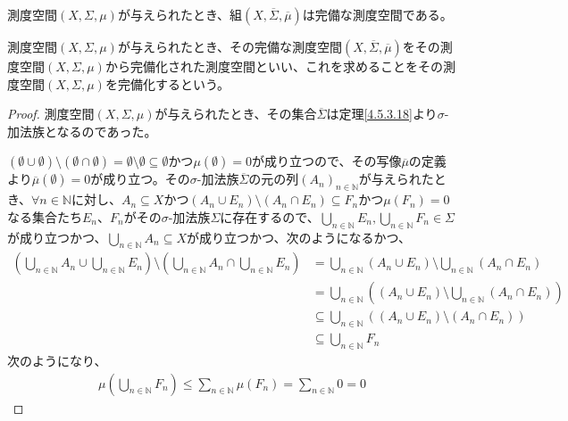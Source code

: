 \documentclass[dvipdfmx]{jsarticle}
\begin{document}
\begin{thm}\label{4.5.3.21}
測度空間$(X,\varSigma,\mu)$が与えられたとき、組$\left( X,\overline{\varSigma},\overline{\mu} \right)$は完備な測度空間である。
\end{thm}
\begin{dfn}
測度空間$(X,\varSigma,\mu)$が与えられたとき、その完備な測度空間$\left( X,\overline{\varSigma},\overline{\mu} \right)$をその測度空間$(X,\varSigma,\mu)$から完備化された測度空間といい、これを求めることをその測度空間$(X,\varSigma,\mu)$を完備化するという。
\end{dfn}
\begin{proof}
測度空間$(X,\varSigma,\mu)$が与えられたとき、その集合$\overline{\varSigma}$は定理\ref{4.5.3.18}より$\sigma$-加法族となるのであった。\par
$(\emptyset \cup \emptyset) \setminus (\emptyset \cap \emptyset) = \emptyset \setminus \emptyset \subseteq \emptyset$かつ$\mu(\emptyset) = 0$が成り立つので、その写像$\overline{\mu}$の定義より$\overline{\mu}(\emptyset) = 0$が成り立つ。その$\sigma$-加法族$\overline{\varSigma}$の元の列$\left( A_{n} \right)_{n \in \mathbb{N}}$が与えられたとき、$\forall n \in \mathbb{N}$に対し、$A_{n} \subseteq X$かつ$\left( A_{n} \cup E_{n} \right) \setminus \left( A_{n} \cap E_{n} \right) \subseteq F_{n}$かつ$\mu\left( F_{n} \right) = 0$なる集合たち$E_{n}$、$F_{n}$がその$\sigma$-加法族$\varSigma$に存在するので、$\bigcup_{n \in \mathbb{N}} E_{n},\bigcup_{n \in \mathbb{N}} F_{n} \in \varSigma$が成り立つかつ、$\bigcup_{n \in \mathbb{N}} A_{n} \subseteq X$が成り立つかつ、次のようになるかつ、
\begin{align*}
\left( \bigcup_{n \in \mathbb{N}} A_{n} \cup \bigcup_{n \in \mathbb{N}} E_{n} \right) \setminus \left( \bigcup_{n \in \mathbb{N}} A_{n} \cap \bigcup_{n \in \mathbb{N}} E_{n} \right) &= \bigcup_{n \in \mathbb{N}} \left( A_{n} \cup E_{n} \right) \setminus \bigcup_{n \in \mathbb{N}} \left( A_{n} \cap E_{n} \right)\\
&= \bigcup_{n \in \mathbb{N}} \left( \left( A_{n} \cup E_{n} \right) \setminus \bigcup_{n \in \mathbb{N}} \left( A_{n} \cap E_{n} \right) \right)\\
&\subseteq \bigcup_{n \in \mathbb{N}} \left( \left( A_{n} \cup E_{n} \right) \setminus \left( A_{n} \cap E_{n} \right) \right)\\
&\subseteq \bigcup_{n \in \mathbb{N}} F_{n}
\end{align*}
次のようになり、
\begin{align*}
\mu\left( \bigcup_{n \in \mathbb{N}} F_{n} \right) \leq \sum_{n \in \mathbb{N}} {\mu\left( F_{n} \right)} = \sum_{n \in \mathbb{N}} 0 = 0

\end{align*}
\end{proof}
\end{document}
